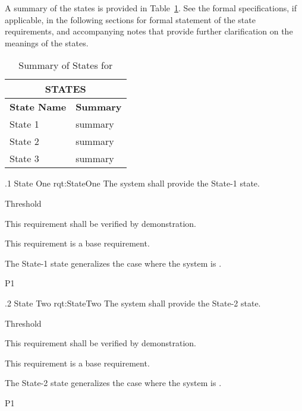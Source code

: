A summary of the states is provided in Table~\ref{tab:States}.
See the formal specifications, if applicable, in the following sections for formal statement of the state requirements, and accompanying notes that provide further clarification on the meanings of the states.

\begin{table}[h]
	\begin{center}
		\begin{tabular}{|p{1.0in}|p{5.0in}|}
			\hline
			\hline
			\multicolumn{2}{|c|}{{\bf STATES}} \\
			\hline
				{\bf State Name} & {\bf Summary} \\
			\hline
			\hline
State 1 & summary \\ \hline
State 2 & summary \\ \hline
State 3 & summary \\ 
			\hline
			\hline
		\end{tabular}
		\caption{Summary of States for \ThisSystem}
		\label{tab:States}
	\end{center}
\end{table}


\ONERQMTV
{\RqtNumberBase.1}
{State One}
{rqt:StateOne}
{The system shall provide the State-1 state.}
{
	\item [Phase 1] Threshold
}
{This requirement shall be verified by demonstration.}
{
	\item [N/A] This requirement is a base requirement.
}
{
	\item The State-1 state generalizes the case where the system is \TBD.
}
{P1}


\ONERQMTV
{\RqtNumberBase.2}
{State Two}
{rqt:StateTwo}
{The system shall provide the State-2 state.}
{
	\item [Phase 1] Threshold
}
{This requirement shall be verified by demonstration.}
{
	\item [N/A] This requirement is a base requirement.
}
{
	\item The State-2 state generalizes the case where the system is \TBD.
}
{P1}



